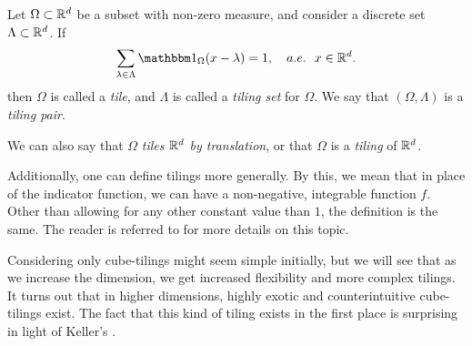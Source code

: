 \documentclass[../thesis.tex]{subfiles}
\begin{document}
\begin{definition}\label{def:tiling}
    Let $\Omega \subset \mathbb{R}^d$ be a subset with non-zero measure, and consider a discrete set $\Lambda \subset \mathbb{R}^d$. If
    \begin{equation}\label{eq:tiling_set}
        \sum_{\lambda \in \Lambda} \indicator{\Omega}{x-\lambda} = 1, \quad a.e. \text{\space\space} x \in \R^d.
    \end{equation}
    then $\Omega$ is called a \emph{tile}, and $\Lambda$ is called a \emph{tiling set} for $\Omega$. We say that $(\Omega, \Lambda)$ is a \emph{tiling pair}.
\end{definition}
\begin{remark}
    We can also say that $\Omega$ \emph{tiles $\mathbb{R}^d$ by translation}, or that $\Omega$ is a \emph{tiling} of $\mathbb{R}^d$. 
\end{remark}
\begin{remark}
    Additionally, one can define tilings more generally. By this, we mean that in place of the indicator function, we can have a non-negative, integrable function $f$. Other than allowing for any other constant value than $1$, the definition is the same. The reader is referred to \cite{kolountzakisTilingsTranslation2010,kolountzakisStructureTilingsLine1996} for more details on this topic.
\end{remark}

Considering only cube-tilings might seem simple initially, but we will see that as we increase the dimension, we get increased flexibility and more complex tilings. It turns out that in higher dimensions, highly exotic and counterintuitive cube-tilings exist. The fact that this kind of tiling exists in the first place is surprising in light of Keller's  \cite{iosevichSpectralTilingProperties1998}.
\end{document}

